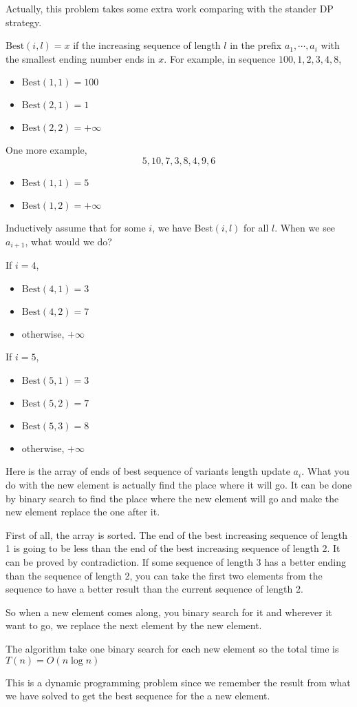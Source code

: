Actually, this problem takes some extra work comparing with the stander DP strategy.

$\text{Best}(i,l) = x$ if the increasing sequence of length $l$ in the prefix $a_1, \cdots, a_i$ with the smallest ending number ends in $x$.
For example, in sequence $100, 1, 2, 3, 4, 8$,
\begin{itemize}
	\item $\text{Best}(1,1) = 100$
	\item $\text{Best}(2,1) = 1$
	\item $\text{Best}(2,2) = +\infty$
\end{itemize}
One more example, $$5, 10, 7, 3, 8, 4, 9, 6$$
\begin{itemize}
	\item $\text{Best}(1,1) = 5$
	\item $\text{Best}(1,2) = +\infty$
\end{itemize}

Inductively assume that for some $i$, we have Best$(i, l)$ for all $l$.
When we see $a_{i+1}$, what would we do?

If $i = 4$,
\begin{itemize}
	\item $\text{Best}(4,1) = 3$
	\item $\text{Best}(4,2) = 7$
	\item otherwise, $+\infty$
\end{itemize}

If $i = 5$,
\begin{itemize}
	\item $\text{Best}(5,1) = 3$
	\item $\text{Best}(5,2) = 7$
	\item $\text{Best}(5,3) = 8$
	\item otherwise, $+\infty$
\end{itemize}

Here is the array of ends of best sequence of variants length update $a_i$. What you do with the new element is actually find the place where it will go. It can be done by binary search to find the place where the new element will go and make the new element replace the one after it. 

First of all, the array is sorted. The end of the best increasing sequence of length 1 is going to be less than the end of the best increasing sequence of length 2. It can be proved by contradiction. If some sequence of length 3 has a better ending than the sequence of length 2, you can take the first two elements from the sequence to have a better result than the current sequence of length 2.

So when a new element comes along, you binary search for it and wherever it want to go, we replace the next element by the new element.

The algorithm take one binary search for each new element so the total time is $T(n) = O(n\log n)$

This is a dynamic programming problem since we remember the result from what we have solved to get the best sequence for the a new element.


